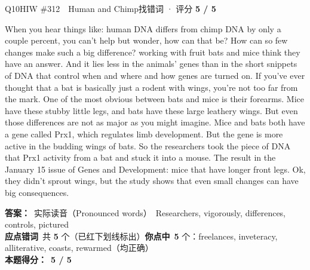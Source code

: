 \begin{qblock}{Q10\quad HIW \#312\ \ Human and Chimp}{找错词 · 评分 \textcolor{cAccent}{\bfseries 5 / 5}}
\begin{promptbox}
When you hear things like: human DNA differs from chimp DNA by only a couple percent, you can't help but wonder, how can that be? How can so few changes make such a big difference?  working with fruit bats and mice think they have an answer. And it lies less in the animals' genes than in the short snippets of DNA that control when and where and how  genes are turned on. If you've ever thought that a bat is basically just a rodent with wings, you're not too far from the mark. One of the most obvious  between bats and mice is their forearms. Mice have these stubby little legs, and bats have these large leathery wings. But even those differences are not as major as you might imagine. Mice and bats both have a gene called Prx1, which regulates limb development. But the gene is more active in the budding wings of bats. So the researchers took the piece of DNA that  Prx1 activity from a bat and stuck it into a mouse. The result  in the January 15 issue of Genes and Development: mice that have longer front legs. Ok, they didn't sprout wings, but the study shows that even small changes can have big consequences.
\end{promptbox}
\par\smallskip
\textbf{答案：}\ 实际读音（Pronounced words）\ {\color{cFix}Researchers, vigorously, differences, controls, pictured}\\
\textbf{应点错词}\ 共 \textbf{5} 个（已红下划线标出）\qquad\textbf{你点中}\ \textbf{5} 个：freelances, inveteracy, alliterative, coasts, rewarmed（均正确）\\[2pt]\textbf{本题得分：}\ {\color{cAccent}\bfseries 5 / 5}
\end{qblock}

